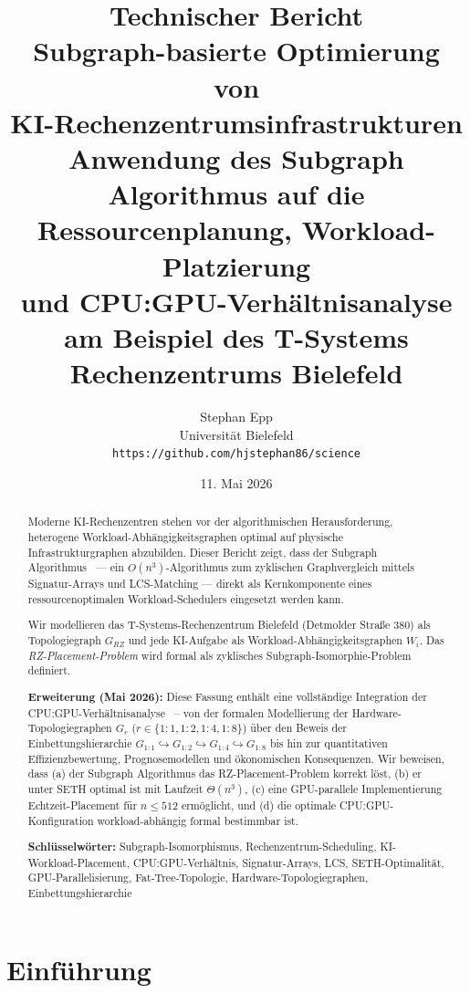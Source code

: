 ﻿\documentclass[a4paper,12pt]{article}
\title{%
  {\large Technischer Bericht}\\[1em]
  {\LARGE\bfseries\color{mainblue} Subgraph-basierte Optimierung von\\[0.3em]
  KI-Rechenzentrumsinfrastrukturen}\\[0.5em]
  {\large Anwendung des Subgraph Algorithmus auf die\\
  Ressourcenplanung, Workload-Platzierung\\
  und CPU:GPU-Verh\"{a}ltnisanalyse\\
  am Beispiel des T-Systems Rechenzentrums Bielefeld}
}
\author{Stephan Epp\\
  \small Universit\"{a}t Bielefeld\\
  \small \texttt{https://github.com/hjstephan86/science}
}
\date{11. Mai 2026}
\theoremstyle{definition}
\begin{document}
\maketitle
\thispagestyle{empty}

\begin{abstract}
\noindent
Moderne KI-Rechenzentren stehen vor der algorithmischen Herausforderung, heterogene Workload-Abh\"{a}ngigkeitsgraphen optimal auf physische Infrastrukturgraphen abzubilden.
Dieser Bericht zeigt, dass der Subgraph Algorithmus~\cite{epp2026subgraph} --- ein $O(n^3)$-Algorithmus zum zyklischen Graphvergleich mittels Signatur-Arrays und LCS-Matching --- direkt als Kernkomponente eines ressourcenoptimalen Workload-Schedulers eingesetzt werden kann.

Wir modellieren das T-Systems-Rechenzentrum Bielefeld (Detmolder Stra{\ss}e 380) als Topologiegraph $G_{RZ}$ und jede KI-Aufgabe als Workload-Abh\"{a}ngigkeitsgraphen $W_i$.
Das \emph{RZ-Placement-Problem} wird formal als zyklisches Subgraph-Isomorphie-Problem definiert.

\textbf{Erweiterung (Mai 2026):} Diese Fassung enth\"{a}lt eine vollst\"{a}ndige Integration der CPU:GPU-Verh\"{a}ltnisanalyse~\cite{computerbase2026} -- von der formalen Modellierung der Hardware-Topologiegraphen $G_{r}$ ($r \in \{1:1, 1:2, 1:4, 1:8\}$)
\"{u}ber den Beweis der Einbettungshierarchie $G_{1:1} \hookrightarrow G_{1:2} \hookrightarrow G_{1:4} \hookrightarrow G_{1:8}$
bis hin zur quantitativen Effizienz\-bewertung, Prognosemodellen und \"{o}konomischen Konsequenzen.
Wir beweisen, dass (a) der Subgraph Algorithmus das RZ-Placement-Problem korrekt l\"{o}st, (b) er unter SETH optimal ist mit Laufzeit $\Theta(n^3)$, (c) eine GPU-parallele Implementierung Echtzeit-Placement f\"{u}r $n \leq 512$ erm\"{o}glicht, und (d) die optimale CPU:GPU-Konfiguration workload-abh\"{a}ngig formal bestimmbar ist.

\medskip
\noindent\textbf{Schl\"{u}sselw\"{o}rter:} Subgraph-Isomorphismus, Rechenzentrum-Scheduling, KI-Workload-Placement, CPU:GPU-Verh\"{a}ltnis, Signatur-Arrays, LCS, SETH-Optimalit\"{a}t, GPU-Parallelisierung, Fat-Tree-Topologie, Hardware-Topologiegraphen, Einbettungshierarchie
\end{abstract}

\newpage
\tableofcontents
\newpage

\section{Einf\"{u}hrung}
\end{document}
